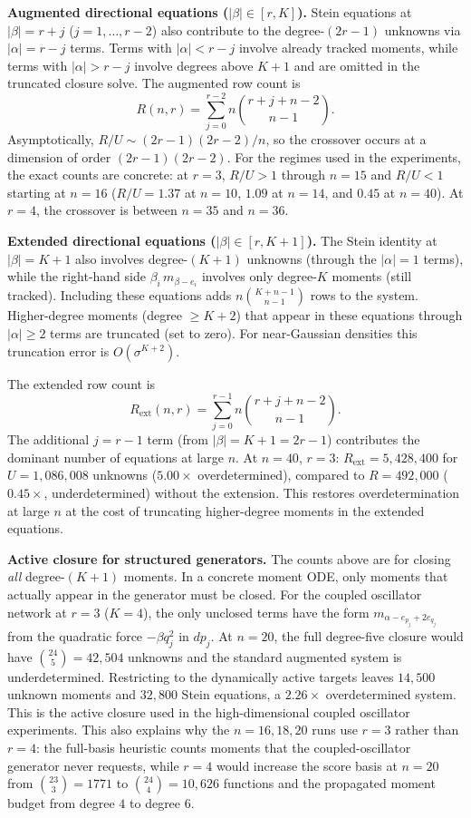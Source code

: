 \documentclass{article}
\theoremstyle{definition}
\begin{document}
\textbf{Augmented directional equations ($|\beta| \in [r, K]$).}
Stein equations at $|\beta| = r{+}j$ ($j = 1, \ldots, r{-}2$)
also contribute to the degree-$(2r{-}1)$ unknowns
via $|\alpha| = r{-}j$ terms.
Terms with $|\alpha|<r{-}j$ involve already tracked moments, while
terms with $|\alpha|>r{-}j$ involve degrees above $K{+}1$ and are
omitted in the truncated closure solve.
The augmented row count is
\[
    R(n,r) = \sum_{j=0}^{r-2} n\binom{r{+}j{+}n{-}2}{n{-}1}.
\]
Asymptotically, $R/U \sim (2r{-}1)(2r{-}2)/n$,
so the crossover occurs at a dimension of order
$(2r{-}1)(2r{-}2)$.
For the regimes used in the experiments, the exact counts are concrete:
at $r{=}3$, $R/U>1$ through $n{=}15$ and $R/U<1$ starting at $n{=}16$
($R/U = 1.37$ at $n{=}10$, $1.09$ at $n{=}14$,
and $0.45$ at $n{=}40$).
At $r{=}4$, the crossover is between $n{=}35$ and $n{=}36$.

\textbf{Extended directional equations ($|\beta| \in [r, K{+}1]$).}
The Stein identity at $|\beta| = K{+}1$ also involves
degree-$(K{+}1)$ unknowns (through the $|\alpha|=1$ terms),
while the right-hand side $\beta_i\,m_{\beta-e_i}$ involves
only degree-$K$ moments (still tracked).
Including these equations adds
$n\binom{K{+}n{-}1}{n{-}1}$ rows to the system.
Higher-degree moments (degree $\ge K{+}2$) that appear in
these equations through $|\alpha| \ge 2$ terms are truncated
(set to zero). For near-Gaussian densities this truncation
error is $O(\sigma^{K+2})$.

The extended row count is
\[
    R_{\mathrm{ext}}(n,r) = \sum_{j=0}^{r-1}
    n\binom{r{+}j{+}n{-}2}{n{-}1}.
\]
The additional $j = r{-}1$ term (from $|\beta| = K{+}1 = 2r{-}1$)
contributes the dominant number of equations at large $n$.
At $n{=}40$, $r{=}3$: $R_{\mathrm{ext}} = 5{,}428{,}400$
for $U = 1{,}086{,}008$ unknowns ($5.00\times$ overdetermined),
compared to $R = 492{,}000$ ($0.45\times$, underdetermined) without
the extension.
This restores overdetermination at large $n$ at the cost of
truncating higher-degree moments in the extended equations.

\textbf{Active closure for structured generators.}
The counts above are for closing \emph{all} degree-$(K{+}1)$ moments.
In a concrete moment ODE, only moments that actually appear in the
generator must be closed. For the coupled oscillator network at
$r{=}3$ ($K{=}4$), the only unclosed terms have the form
$m_{\alpha-e_{p_j}+2e_{q_j}}$ from the quadratic force
$-\beta q_j^2$ in $dp_j$.
At $n{=}20$, the full degree-five closure would have
$\binom{24}{5}=42{,}504$ unknowns and the standard augmented system is
underdetermined. Restricting to the dynamically active targets leaves
$14{,}500$ unknown moments and $32{,}800$ Stein equations, a
$2.26\times$ overdetermined system. This is the active closure used in
the high-dimensional coupled oscillator experiments. This also explains
why the $n{=}16,18,20$ runs use $r{=}3$ rather than $r{=}4$: the
full-basis heuristic counts moments that the coupled-oscillator generator
never requests, while $r{=}4$ would increase the score basis at $n{=}20$
from $\binom{23}{3}=1771$ to $\binom{24}{4}=10{,}626$ functions and
the propagated moment budget from degree $4$ to degree $6$.
\end{document}
